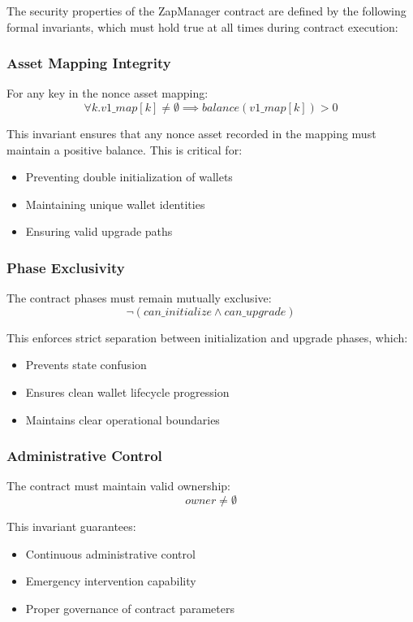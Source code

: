 The security properties of the ZapManager contract are defined by the following formal invariants, which must hold true at all times during contract execution:

\subsubsection{Asset Mapping Integrity}
For any key in the nonce asset mapping:
\[ \forall k. v1\_map[k] \neq \emptyset \implies balance(v1\_map[k]) > 0 \]

This invariant ensures that any nonce asset recorded in the mapping must maintain a positive balance. This is critical for:
\begin{itemize}
   \item Preventing double initialization of wallets
   \item Maintaining unique wallet identities
   \item Ensuring valid upgrade paths
\end{itemize}

\subsubsection{Phase Exclusivity}
The contract phases must remain mutually exclusive:
\[ \neg(can\_initialize \land can\_upgrade) \]

This enforces strict separation between initialization and upgrade phases, which:
\begin{itemize}
   \item Prevents state confusion
   \item Ensures clean wallet lifecycle progression
   \item Maintains clear operational boundaries
\end{itemize}

\subsubsection{Administrative Control}
The contract must maintain valid ownership:
\[ owner \neq \emptyset \]

This invariant guarantees:
\begin{itemize}
   \item Continuous administrative control
   \item Emergency intervention capability
   \item Proper governance of contract parameters
\end{itemize}

